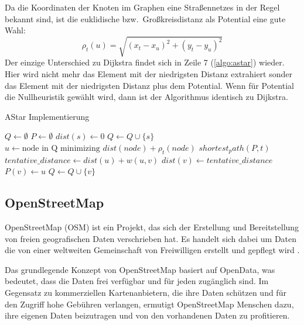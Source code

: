 Da die Koordinaten der Knoten im Graphen eine Straßennetzes in der Regel bekannt sind, ist die
euklidische bzw.~Großkreisdistanz als Potential eine gute Wahl:
\begin{equation}
    \rho_t(u) = \sqrt{(x_t - x_u)^2 + (y_t - y_u)^2}
\end{equation}
Der einzige Unterschied zu Dijkstra findet sich in Zeile 7 (\ref{algo:astar}) wieder. Hier wird
nicht mehr das Element mit der niedrigsten Distanz extrahiert sonder das Element mit der niedrigsten
Distanz plus dem Potential. Wenn für Potential die Nullheuristik gewählt wird, dann ist der
Algorithmus identisch zu Dijkstra.\\
\begin{algorithm}[h]
    \caption{AStar Implementierung}
    \label{algo:astar}
    \begin{algorithmic}[1]
        \State $Q \gets \emptyset$
        \State $P \gets \emptyset$ 
        \State $dist(s) \gets 0$
        \State $Q \gets Q \cup \{s\}$
        \State $u \gets \text{node in Q minimizing } dist(node) + \rho_t(node)$ 
        \State \Return $shortest_path(P,t)$
        \EndIf
        \State $tentative\_distance \gets dist(u) + w(u,v)$
        \State $dist(v) \gets tentative\_distance$
        \State $P(v) \gets u$
        \State $Q \gets Q \cup \{v\}$
        \EndIf
        \EndFor
        \EndWhile
        \EndFunction
    \end{algorithmic}
\end{algorithm}

\subsection{OpenStreetMap}
OpenStreetMap (OSM) ist ein Projekt, das sich der Erstellung und Bereitstellung von freien
geografischen Daten verschrieben hat. Es handelt sich dabei um Daten die von einer weltweiten
Gemeinschaft von Freiwilligen erstellt und gepflegt wird \cite{osm.about}.

Das grundlegende Konzept von OpenStreetMap basiert auf OpenData, was bedeutet, dass die Daten frei
verfügbar und für jeden zugänglich sind. Im Gegensatz zu kommerziellen Kartenanbietern, die ihre
Daten schützen und für den Zugriff hohe Gebühren verlangen, ermutigt OpenStreetMap Menschen dazu,
ihre eigenen Daten beizutragen und von den vorhandenen Daten zu profitieren.

